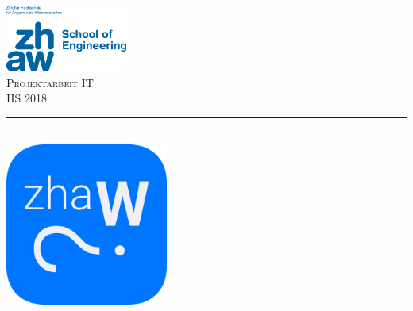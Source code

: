 
\begin{titlepage} %
	\newcommand{\HRule}{\rule{\linewidth}{0.5mm}} %

	\center %


	\includegraphics[width=0.3\textwidth, left]{../assets/zhawLogo.jpeg}\\[1cm]

	\textsc{\Large Projektarbeit IT}\\[0.5cm] %

	\textsc{\large HS 2018}\\[0.5cm] %


	\HRule\\[0.5cm]


	\includegraphics[width=0.4\textwidth]{../assets/zhawoLogo.png}\\[0.5cm]


\end{titlepage}
